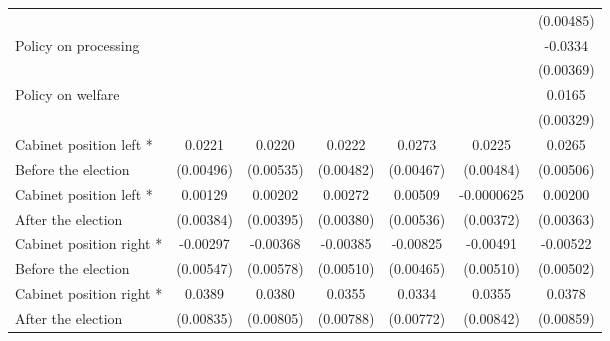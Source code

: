 \begin{table}[!ht]
\begin{tabular}{l*{6}{c}}
                    &                     &                     &                     &                     &                     &   (0.00485)         \\
[0.5em]
Policy on processing&                     &                     &                     &                     &                     &     -0.0334\sym{***}\\
                    &                     &                     &                     &                     &                     &   (0.00369)         \\
[0.5em]
Policy on welfare   &                     &                     &                     &                     &                     &      0.0165\sym{***}\\
                    &                     &                     &                     &                     &                     &   (0.00329)         \\
[0.5em]
Cabinet position left * &      0.0221\sym{***}&      0.0220\sym{***}&      0.0222\sym{***}&      0.0273\sym{***}&      0.0225\sym{***}&      0.0265\sym{***}\\
Before the election                    &   (0.00496)         &   (0.00535)         &   (0.00482)         &   (0.00467)         &   (0.00484)         &   (0.00506)         \\
[0.5em]
Cabinet position left * &     0.00129         &     0.00202         &     0.00272         &     0.00509         &  -0.0000625         &     0.00200         \\
After the election                    &   (0.00384)         &   (0.00395)         &   (0.00380)         &   (0.00536)         &   (0.00372)         &   (0.00363)         \\
[0.5em]
Cabinet position right * &    -0.00297         &    -0.00368         &    -0.00385         &    -0.00825         &    -0.00491         &    -0.00522         \\
Before the election                    &   (0.00547)         &   (0.00578)         &   (0.00510)         &   (0.00465)         &   (0.00510)         &   (0.00502)         \\
[0.5em]
Cabinet position right * &      0.0389\sym{***}&      0.0380\sym{***}&      0.0355\sym{***}&      0.0334\sym{***}&      0.0355\sym{***}&      0.0378\sym{***}\\
After the election                    &   (0.00835)         &   (0.00805)         &   (0.00788)         &   (0.00772)         &   (0.00842)         &   (0.00859)         \\

\end{tabular}
\end{table}
